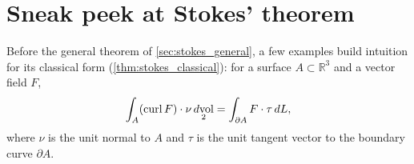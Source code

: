 
\section{Sneak peek at Stokes' theorem}
\label{sec:stokes_sneak_peek}

Before the general theorem of \cref{sec:stokes_general}, a few examples build intuition for its
classical form (\cref{thm:stokes_classical}): for a surface $A \subset \mathbb{R}^3$ and a vector
field $F$,
\[\int_A (\operatorname{curl} F)\cdot \nu \mathop{d\text{vol}}_2 = \int_{\partial A} F \cdot \tau \,dL,\]
where $\nu$ is the unit normal to $A$ and $\tau$ is the unit tangent vector to the boundary curve
$\partial A$.


